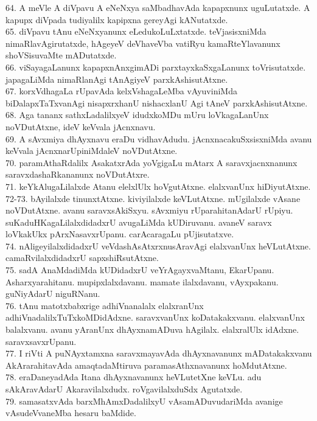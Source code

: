 \documentclass{article}
\begin{document}
64. A meVle A diVpavu A eNeNxya saMbadhavAda kapapxnunx uguLutatxde. A kapupx diVpada tudiyalilx kapipxna gereyAgi kANutatxde.\\
65. diVpavu tAnu eNeNxyanunx eLedukoLuLxtatxde. teVjasisxniMda nimaRlavAgirutatxde, hAgeyeV deVhaveVba vatiRyu kamaRteYlavanunx shoVSisuvaMte mADutatxde.\\
66. viSayagaLanunx kapapxnAnxgimADi parxtayxkaSxgaLanunx toVrisutatxde. japagaLiMda nimaRlanAgi tAnAgiyeV parxkAshisutAtxne.\\
67. korxVdhagaLa rUpavAda kelxVshagaLeMba vAyuviniMda biDalapxTaTxvanAgi nisapxrxhanU nishacxlanU Agi tAneV parxkAshisutAtxne.\\
68. Aga tananx sathxLadalilxyeV idudxkoMDu mUru loVkagaLanUnx noVDutAtxne, ideV keVvala jAcnxnavu.\\
69. A sAvxmiya dhAyxnavu eraDu vidhavAdudu. jAcnxnacakuSxsisxniMda avanu keVvala jAcnxnarUpiniMdaleV noVDutAtxne.\\
70. paramAthaRdalilx AsakatxrAda yoVgigaLu mAtarx A saravxjacnxnanunx saravxdashaRkananunx noVDutAtxre.\\
71. keYkAlugaLilalxde Atanu elelxlUlx hoVgutAtxne. elalxvanUnx hiDiyutAtxne.\\
72-73. bAyilalxde tinunxtAtxne. kiviyilalxde keVLutAtxne. mUgilalxde vAsane noVDutAtxne. avanu saravxsAkiSxyu. sAvxmiyu rUparahitanAdarU rUpiyu. suKaduHKagaLilalxdidadxrU avugaLiMda kUDiruvanu. avaneV saravx loVkakUkx pArxNasavxrUpanu. carAcaragaLu pUjisutatxve.\\
74. nAligeyilalxdidadxrU veVdashAsAtxrxnusAravAgi elalxvanUnx heVLutAtxne. camaRvilalxdidadxrU sapxshiRsutAtxne.\\
75. sadA AnaMdadiMda kUDidadxrU veYrAgayxvaMtanu, EkarUpanu. Asharxyarahitanu. mupipxlalxdavanu. mamate ilalxdavanu, vAyxpakanu. guNiyAdarU niguRNanu.\\
76. tAnu matotxbabxrige adhiVnanalalx elalxranUnx adhiVnadalilxTuTxkoMDidAdxne. saravxvanUnx koDatakakxvanu. elalxvanUnx balalxvanu. avanu yAranUnx dhAyxnamADuva hAgilalx. elalxralUlx idAdxne. saravxsavxrUpanu.\\
77. I riVti A puNAyxtamxna saravxmayavAda dhAyxnavanunx mADatakakxvanu AkArarahitavAda amaqtadaMtiruva paramasAthxnavanunx hoMdutAtxne.\\
78. eraDaneyadAda Itana dhAyxnavanunx heVLutetXne keVLu. adu sAkAravAdarU Akaravilalxdudx. roVgavilalxduSdx Agutatxde.\\
79. samasatxvAda barxMhAmxDadalilxyU vAsamADuvudariMda avanige vAsudeVvaneMba hesaru   baMdide.\\
\end{document}
